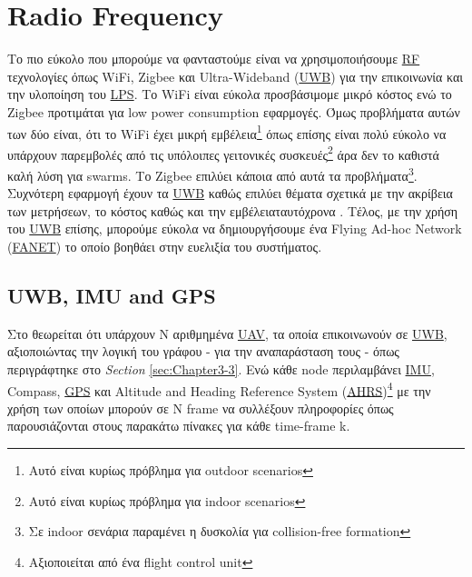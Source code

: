 

\section{Radio Frequency}
Το πιο εύκολο που μπορούμε να φανταστούμε είναι να χρησιμοποιήσουμε \hyperref[abbr:RF]{RF} τε\-χνο\-λο\-γίες
όπως WiFi, Zigbee και Ultra-Wideband (\hyperref[abbr:UWB]{UWB}) για την επικοινωνία και την υλοποίηση του \hyperref[abbr:LPS]{LPS}.   
Το WiFi είναι εύκολα προσβάσιμο\udot με μικρό κόστος ενώ το Zigbee προτιμάται για
low power consumption εφαρμογές. Όμως προβλήματα αυτών των δύο είναι, ότι το 
WiFi έχει μικρή εμβέλεια\footnote{Αυτό είναι κυρίως πρόβλημα για outdoor scenarios} όπως επίσης είναι πολύ εύκολο 
να υπάρχουν παρεμβολές από τις υπόλοιπες γειτονικές συσκευές\footnote{Αυτό είναι κυρίως πρόβλημα για indoor scenarios} 
άρα δεν το καθιστά καλή λύση για swarms. Το Zigbee επιλύει κάποια από αυτά τα 
προβλήματα\footnote{Σε indoor σενάρια παραμένει η δυσκολία για collision-free formation}. Συχνότερη εφαρμογή έχουν 
τα \hyperref[abbr:UWB]{UWB} καθώς επιλύει θέματα σχετικά με την ακρίβεια των μετρήσεων, το κόστος καθώς και την 
εμβέλεια\udot ταυτόχρονα \cite{uwb-imu-gps3}. Τέλος, με την χρήση του \hyperref[abbr:UWB]{UWB} επίσης, μπορούμε εύκολα να δημιουργήσουμε
ένα Flying Ad-hoc Network (\hyperref[abbr:FANET]{FANET}) το οποίο βοηθάει στην ευελιξία του συστήματος.




\subsection{UWB, IMU and GPS}
Στο \cite{uwb-imu-gps1} θεωρείται ότι υπάρχουν Ν αριθμημένα \hyperref[abbr:UAV]{UAV}, τα οποία επικοινωνούν σε \hyperref[abbr:UWB]{UWB}, 
αξιοποιώντας την λογική του γράφου - για την αναπαράσταση τους - όπως 
περιγράφτηκε στο \emph{Section} \ref{sec:Chapter3-3}. Ενώ κάθε node περιλαμβάνει \hyperref[abbr:IMU]{IMU}, Compass, \hyperref[abbr:GPS]{GPS} και A\-lti\-tu\-de and Heading Re\-fe\-re\-nce 
System (\hyperref[abbr:AHRS]{AHRS})\footnote{Αξιοποιείται από ένα flight control unit} με την χρήση των οποίων μπορούν σε N frame να συλλέξουν 
πληροφορίες όπως παρουσιάζονται στους πα\-ρα\-κά\-τω πίνακες για κάθε time-frame k.

